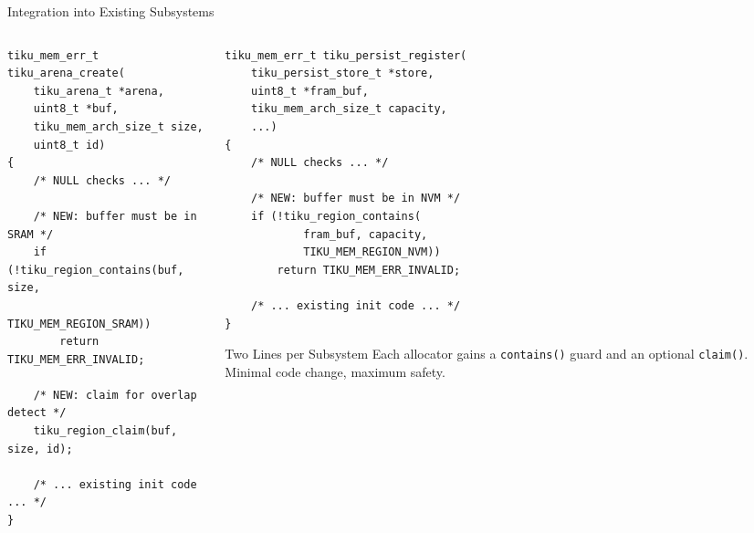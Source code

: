 \documentclass[aspectratio=169, 10pt]{beamer}
\begin{document}
\begin{frame}[fragile]{Integration into Existing Subsystems}
\begin{columns}[T]
\begin{column}{0.48\textwidth}
\begin{lstlisting}[style=cstyle, title={tiku\_arena\_create() --- added check}]
tiku_mem_err_t tiku_arena_create(
    tiku_arena_t *arena,
    uint8_t *buf,
    tiku_mem_arch_size_t size,
    uint8_t id)
{
    /* NULL checks ... */

    /* NEW: buffer must be in SRAM */
    if (!tiku_region_contains(buf, size,
            TIKU_MEM_REGION_SRAM))
        return TIKU_MEM_ERR_INVALID;

    /* NEW: claim for overlap detect */
    tiku_region_claim(buf, size, id);

    /* ... existing init code ... */
}
\end{lstlisting}
\end{column}

\begin{column}{0.48\textwidth}
\begin{lstlisting}[style=cstyle, title={tiku\_persist\_register() --- added check}]
tiku_mem_err_t tiku_persist_register(
    tiku_persist_store_t *store,
    uint8_t *fram_buf,
    tiku_mem_arch_size_t capacity,
    ...)
{
    /* NULL checks ... */

    /* NEW: buffer must be in NVM */
    if (!tiku_region_contains(
            fram_buf, capacity,
            TIKU_MEM_REGION_NVM))
        return TIKU_MEM_ERR_INVALID;

    /* ... existing init code ... */
}
\end{lstlisting}

\vspace{0.3em}
\begin{alertblock}{Two Lines per Subsystem}
Each allocator gains a \texttt{contains()} guard and an optional
\texttt{claim()}. Minimal code change, maximum safety.
\end{alertblock}
\end{column}
\end{columns}
\end{frame}
\end{document}
